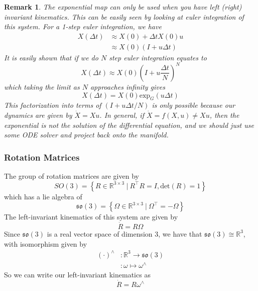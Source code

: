 \documentclass[a4paper]{article}
\newtheorem*{rem}{Remark}
\begin{document}
\begin{rem}
  The exponential map can only be used when you have left (right) invariant kinematics. This can be easily seen by looking at euler integration of this system. For a 1-step euler integration, we have
  \[
    \begin{aligned}
      X(\Delta t) &\approx X(0) + \Delta tX(0)u \\
            &\approx X(0) \left( I + u \Delta t\right)
    \end{aligned}
  \]
  It is easily shown that if we do $N$ step euler integration equates to
  \[
    X(\Delta t) \approx X(0) \left(I + u \frac{\Delta t}{N} \right)^N
  \]
  which taking the limit as $N$ approaches infinity gives
  \[
    X(\Delta t) = X(0) \text{exp}_G(u \Delta t)
  \]
  This factorization into terms of $(I + u \Delta t/N)$ is only possible because our dynamics are given by $\dot{X} = Xu$. In general, if $\dot{X} = f(X,u) \neq Xu$, then the exponential is not the solution of the differential equation, and we should just use some ODE solver and project back onto the manifold.
\end{rem}




\subsubsection*{Rotation Matrices}%
The group of rotation matrices are given by 
\[
  SO(3) = \left\{ R \in \mathds{R}^{3 \times 3}\ |\ R^{\top}R = I, \text{det}(R) = 1\right\}
\]
which has a lie algebra of 
\[
  \mathfrak{so}(3) = \left\{ \Omega \in \mathds{R}^{3 \times 3}\ |\ \Omega^\top = -\Omega \right\}
\]
The left-invariant kinematics of this system are given by
\[
  \dot{R} = R \Omega
\]
Since $\mathfrak{so}(3)$ is a real vector space of dimension 3, we have that $\mathfrak{so}(3) \cong \mathds{R}^3$, with isomorphism given by
\[
  \begin{aligned}
    (\cdot)^\wedge&: \mathds{R}^3 \rightarrow \mathfrak{so}(3) \\
                  &: \omega \mapsto \omega^{\wedge}
  \end{aligned}
\]
So we can write our left-invariant kinematics as
\[
  \dot{R} = R \omega^{\wedge}
\]
\end{document}
